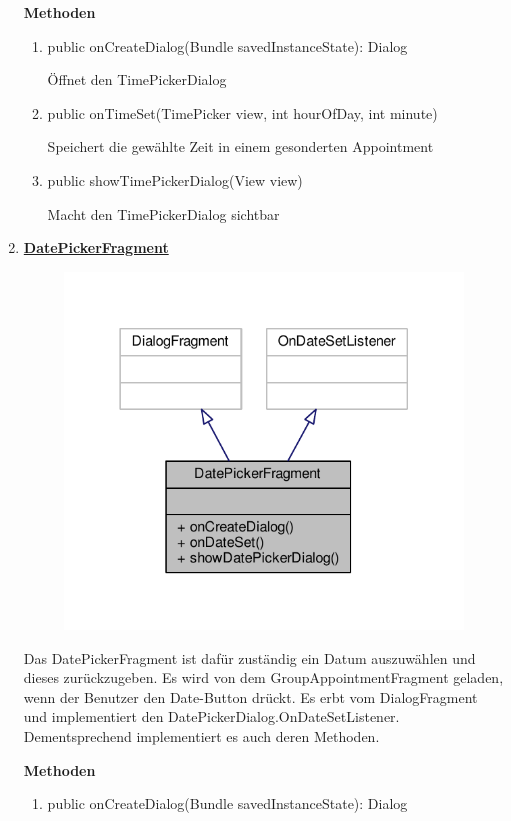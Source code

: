 \begin{enumerate}
	\textbf{Methoden}
	\begin{enumerate}
		\item public onCreateDialog(Bundle savedInstanceState): Dialog
	
		Öffnet den TimePickerDialog
		
		\item public onTimeSet(TimePicker view, int hourOfDay, int minute)
	
		Speichert die gewählte Zeit in einem gesonderten Appointment
		
		\item public showTimePickerDialog(View view)
		
		Macht den TimePickerDialog sichtbar
	\end{enumerate}
	\item \textbf{\underline{DatePickerFragment}}

	\begin{figure}[H]
		\includegraphics[scale = 1]{res/date_picker_fragment__inherit__graph.pdf}
		\centering
	\end{figure}
	Das DatePickerFragment ist dafür zuständig ein Datum auszuwählen und dieses zurückzugeben. Es wird von dem GroupAppointmentFragment geladen, wenn der Benutzer den Date-Button drückt. Es erbt vom DialogFragment und implementiert den DatePickerDialog.OnDateSetListener. Dementsprechend implementiert es auch deren Methoden.

	\textbf{Methoden}
	\begin{enumerate}
		\item public onCreateDialog(Bundle savedInstanceState): Dialog


\end{enumerate}
\end{enumerate}
